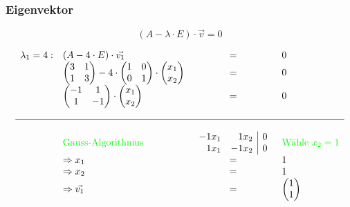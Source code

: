 \subsubsection{Eigenvektor}
$$(A - \lambda \cdot E) \cdot \vec{v} = 0$$

\[
\begin{array}{llcl}
 \lambda_1 = 4: & (A - 4\cdot E) \cdot \vec{v_1} & = & 0 
 \\ 
  &\begin{pmatrix}
     3 & 1 \\
     1 & 3 \\
  \end{pmatrix} - 4 \cdot 
  \begin{pmatrix}
   1 & 0 \\
   0 & 1 \\
  \end{pmatrix} \cdot
  \begin{pmatrix}
   x_1 \\
   x_2 \\
  \end{pmatrix} & = & 0
\\
  &\begin{pmatrix}
     -1 & 1 \\
     1 & -1 \\
  \end{pmatrix} \cdot
  \begin{pmatrix}
   x_1 \\
   x_2 \\
  \end{pmatrix} & = & 0
\\
\\ \hline
\\
  &\color{green}{\text{Gauss-Algorithmus}}
  &\begin{array}{rr|r}
  -1x_1 & 1x_2 & 0 \\
  1x_1 & -1x_2 & 0 \\
  \end {array} & \color{green}{\text{Wähle }x_2=1}
\\
  &\Rightarrow
  x_1 & = & 1
\\
  &\Rightarrow
  x_2 & = & 1
\\
  &\Rightarrow
   \vec{v_1} & = & \begin{pmatrix} 1 \\ 1 \end{pmatrix}
\end{array}
\]

